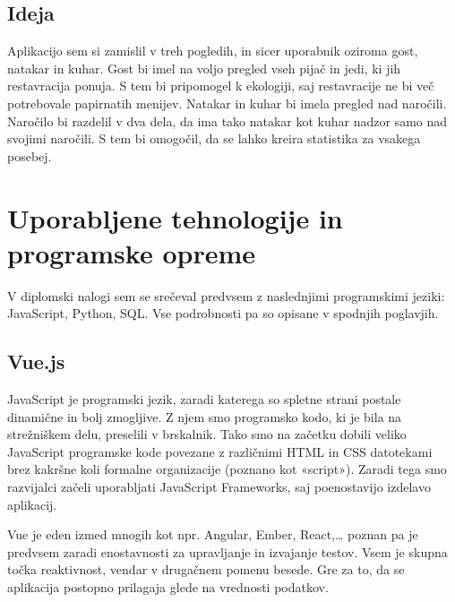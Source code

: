\documentclass[a4paper, 12pt]{book}
\begin{document}
\section {Ideja}
Aplikacijo sem si zamislil v treh pogledih, in sicer uporabnik oziroma gost, natakar in kuhar. Gost bi imel na voljo pregled vseh pijač in jedi, ki jih restavracija ponuja. S tem bi pripomogel k ekologiji, saj restavracije ne bi več potrebovale papirnatih menijev. Natakar in kuhar bi imela pregled nad naročili. Naročilo bi razdelil v dva dela, da ima tako natakar kot kuhar nadzor samo nad svojimi naročili. S tem bi omogočil, da se lahko kreira statistika za vsakega posebej.


\chapter{Uporabljene tehnologije in programske opreme}
V diplomski nalogi sem se srečeval predvsem z naslednjimi programskimi jeziki: JavaScript, Python, SQL. Vse podrobnosti pa so opisane v spodnjih poglavjih.

\section {Vue.js}
JavaScript je programski jezik, zaradi katerega so spletne strani postale dinamične in bolj zmogljive. Z njem smo programsko kodo, ki je bila na strežniškem delu, preselili v brskalnik. Tako smo na začetku dobili veliko JavaScript programske kode povezane z različnimi HTML in CSS datotekami brez kakršne koli formalne organizacije (poznano kot «script»). Zaradi tega smo razvijalci začeli uporabljati JavaScript Frameworks, saj poenostavijo izdelavo aplikacij.


Vue je eden izmed mnogih kot npr. Angular, Ember, React,… poznan pa je predvsem zaradi enostavnosti za upravljanje in izvajanje testov. Vsem je skupna točka reaktivnost, vendar v drugačnem pomenu besede. Gre za to, da se aplikacija postopno prilagaja glede na vrednosti podatkov. 
\end{document}
